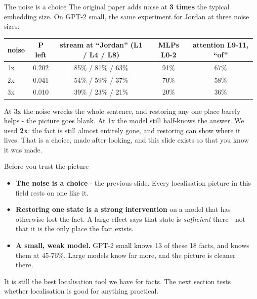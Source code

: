 \documentclass[aspectratio=169]{beamer}
\newcommand{\watchbox}[1]{%
  \begin{tcolorbox}[colback=armorange!12, colframe=armorange, boxrule=0.6pt, arc=2pt]
  #1
  \end{tcolorbox}}
\begin{document}
\begin{frame}{The noise is a choice}
  \vspace{0.3em}
  The original paper adds noise at \textbf{3 times} the typical embedding size. On GPT-2 small, the
  same experiment for Jordan at three noise sizes:

  \vspace{0.4em}
  \begin{center}
  \small
  \begin{tabular}{@{}lcccc@{}}
    \toprule
    noise & P left & stream at ``Jordan'' (L1 / L4 / L8) & MLPs L0-2 & attention L9-11, ``of''\\
    \midrule
    1x & 0.202 & 85\% / 81\% / 63\% & 91\% & 67\%\\
    2x & 0.041 & 54\% / 59\% / 37\% & 70\% & 58\%\\
    3x & 0.010 & 39\% / 23\% / 21\% & 20\% & 36\%\\
    \bottomrule
  \end{tabular}
  \end{center}

  \vspace{0.4em}
  \watchbox{\small At 3x the noise wrecks the whole sentence, and restoring any one place barely
  helps - the picture goes blank. At 1x the model still half-knows the answer. We used \textbf{2x}:
  the fact is still almost entirely gone, and restoring can show where it lives. That is a choice,
  made after looking, and this slide exists so that you know it was made.}
\end{frame}

\begin{frame}{Before you trust the picture}
  \vspace{0.5em}
  \begin{itemize}
    \item \textbf{The noise is a choice} - the previous slide. Every localisation picture in this
      field rests on one like it.
    \item \textbf{Restoring one state is a strong intervention} on a model that has otherwise lost
      the fact. A large effect says that state is \emph{sufficient} there - not that it is the only
      place the fact exists.
    \item \textbf{A small, weak model.} GPT-2 small knows 13 of these 18 facts, and knows
      them at 45-76\%. Large models know far more, and the picture is cleaner there.
  \end{itemize}

  \vspace{0.6em}
  \watchbox{\small It is still the best localisation tool we have for facts. The next section
  tests whether localisation is good for anything practical.}
\end{frame}
\end{document}
